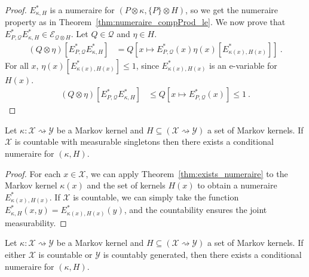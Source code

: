 \begin{proof}
$E^*_{\kappa, H}$ is a numeraire for $(P \otimes \kappa, \{P\} \otimes H)$, so we get the numeraire property as in Theorem~\ref{thm:numeraire_compProd_le}.
We now prove that $E^*_{P, \mathcal{Q}}E^*_{\kappa, H} \in \mathcal{E}_{\mathcal{Q} \otimes H}$.
Let $Q \in \mathcal{Q}$ and $\eta \in H$.
\begin{align*}
  (Q \otimes \eta)\left[E^*_{P, \mathcal{Q}}E^*_{\kappa, H}\right]
  &= Q\left[x \mapsto E^*_{P, \mathcal{Q}}(x) \eta(x)\left[E^*_{\kappa(x), H(x)}\right] \right]
  \: .
\end{align*}
For all $x$, $\eta(x)\left[E^*_{\kappa(x), H(x)}\right] \le 1$, since $E^*_{\kappa(x), H(x)}$ is an e-variable for $H(x)$.
\begin{align*}
  (Q \otimes \eta)\left[E^*_{P, \mathcal{Q}}E^*_{\kappa, H}\right]
  &\le Q\left[x \mapsto E^*_{P, \mathcal{Q}}(x)\right]
  \le 1
  \: .
\end{align*}
\end{proof}


\begin{lemma}\label{lem:exists_condNumeraire_of_countable}
Let $\kappa : \mathcal{X} \rightsquigarrow \mathcal{Y}$ be a Markov kernel and $H \subseteq (\mathcal{X} \rightsquigarrow \mathcal{Y})$ a set of Markov kernels.
If $\mathcal{X}$ is countable with measurable singletons then there exists a conditional numeraire for $(\kappa, H)$.
\end{lemma}

\begin{proof}
For each $x \in \mathcal{X}$, we can apply Theorem~\ref{thm:exists_numeraire} to the Markov kernel $\kappa(x)$ and the set of kernels $H(x)$ to obtain a numeraire $E^*_{\kappa(x), H(x)}$.
If $\mathcal{X}$ is countable, we can simply take the function $E^*_{\kappa, H}(x,y) = E^*_{\kappa(x), H(x)}(y)$, and the countability ensures the joint measurability.
\end{proof}


\begin{theorem}\label{thm:exists_condNumeraire}
Let $\kappa : \mathcal{X} \rightsquigarrow \mathcal{Y}$ be a Markov kernel and $H \subseteq (\mathcal{X} \rightsquigarrow \mathcal{Y})$ a set of Markov kernels.
If either $\mathcal{X}$ is countable or $\mathcal{Y}$ is countably generated, then there exists a conditional numeraire for $(\kappa, H)$.
\end{theorem}

